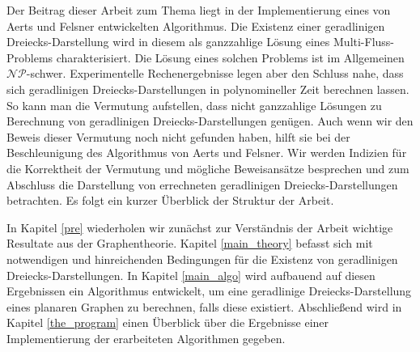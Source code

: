 Der Beitrag dieser Arbeit zum Thema liegt in der Implementierung eines von Aerts und Felsner entwickelten Algorithmus. Die Existenz einer geradlinigen Dreiecks-Darstellung wird in diesem als ganzzahlige Lösung eines Multi-Fluss-Problems charakterisiert. Die Lösung eines solchen Problems ist im Allgemeinen $\mathcal{NP}$-schwer. Experimentelle Rechenergebnisse legen aber den Schluss nahe, dass sich geradlinigen Dreiecks-Darstellungen in polynomineller Zeit berechnen lassen. So kann man die Vermutung aufstellen, dass nicht ganzzahlige Lösungen zu Berechnung von geradlinigen Dreiecks-Darstellungen genügen. Auch wenn wir den Beweis dieser Vermutung noch nicht gefunden haben, hilft sie bei der Beschleunigung des Algorithmus von Aerts und Felsner. Wir werden Indizien für die Korrektheit der Vermutung und mögliche Beweisansätze besprechen und zum Abschluss die Darstellung von errechneten geradlinigen Dreiecks-Darstellungen betrachten. Es folgt ein kurzer Überblick der Struktur der Arbeit.

In Kapitel \ref{pre} wiederholen wir zunächst zur Verständnis der Arbeit wichtige Resultate aus der Graphentheorie. Kapitel \ref{main_theory} befasst sich mit notwendigen und hinreichenden Bedingungen für die Existenz von geradlinigen Dreiecks-Darstellungen. In Kapitel \ref{main_algo} wird aufbauend auf diesen Ergebnissen ein Algorithmus entwickelt, um eine geradlinige Dreiecks-Darstellung eines planaren Graphen zu berechnen, falls diese existiert. Abschließend wird in Kapitel \ref{the_program} einen Überblick über die Ergebnisse einer Implementierung der erarbeiteten Algorithmen gegeben.